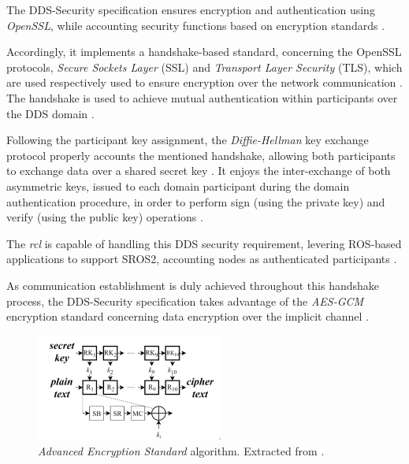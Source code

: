
The DDS-Security specification ensures encryption and authentication using \textit{OpenSSL}, while accounting security functions based on encryption standards \cite{takemoto2019performance}. 

Accordingly, it implements a handshake-based standard, concerning the OpenSSL protocols, \textit{Secure Sockets Layer} (SSL) and \textit{Transport Layer Security} (TLS), which are used respectively used to ensure encryption over the network communication \cite{white2016sros, kim2018security}. The handshake is used to achieve mutual authentication within participants over the DDS domain \cite{white2019network}.

Following the participant key assignment, the \textit{Diffie-Hellman} key exchange protocol properly accounts the mentioned handshake, allowing both participants to exchange data over a shared secret key \cite{kim2018security}. %
It enjoys the inter-exchange of both asymmetric keys, issued to each domain participant during the domain authentication procedure, in order to perform sign (using the private key) and verify (using the public key) operations \cite{kim2018security, diluoffo2018robot}.

The \textit{rcl} is capable of handling this DDS security requirement, levering ROS-based applications to support SROS2, accounting nodes as authenticated participants \cite{white2016sros}. 

As communication establishment is duly achieved throughout this handshake process, the DDS-Security specification takes advantage of the \textit{AES-GCM} encryption standard concerning data encryption over the implicit channel \cite{kim2018security, takemoto2019performance}.

\begin{figure}[H]
    \centering
    \includegraphics[width=0.4\linewidth]{img/ros_aes.png}
    \caption{\textit{Advanced Encryption Standard} algorithm. Extracted from \cite{takemoto2019performance}.}
    \label{fig:ros_aes}
\end{figure}

